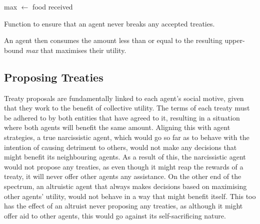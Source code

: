  \begin{algorithm}
        \BlankLine
        max $\gets$ food received \
        \BlankLine
        {
        \BlankLine
        }
        \caption{Function to ensure that an agent never breaks any accepted treaties.}
        \label{code:treatyRange}
\end{algorithm}

An agent then consumes the amount less than or equal to the resulting upper-bound \textit{max} that maximises their utility.


\subsection{Proposing Treaties}\label{proposing_treaties}


Treaty proposals are fundamentally linked to each agent's social motive, given that they work to the benefit of collective utility. The terms of each treaty must be adhered to by both entities that have agreed to it, resulting in a situation where both agents will benefit the same amount. Aligning this with agent strategies, a true narcissistic agent, which would go so far as to behave with the intention of causing detriment to others, would not make any decisions that might benefit its neighbouring agents. As a result of this, the narcissistic agent would not propose any treaties, as even though it might reap the rewards of a treaty, it will never offer other agents any assistance. On the other end of the spectrum, an altruistic agent that always makes decisions based on maximising other agents' utility, would not behave in a way that might benefit itself. This too has the effect of an altruist never proposing any treaties, as although it might offer aid to other agents, this would go against its self-sacrificing nature.

